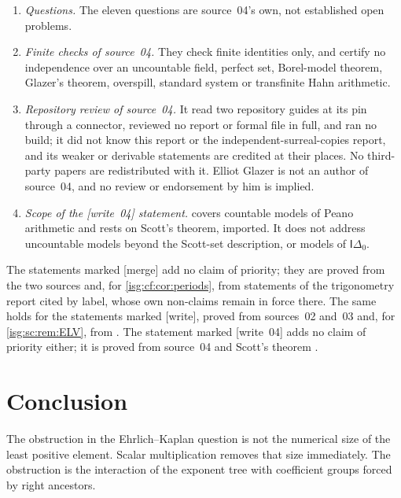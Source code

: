 \documentclass[11pt]{article}
\theoremstyle{definition}
\theoremstyle{remark}
\newcommand{\Idelta}{\mathsf{I}\Delta_0}
\begin{document}
\begin{enumerate}[label=\textup{(N\arabic*)},leftmargin=*]
      enlargement of the Turing ideal by an oracle. The elementary subfields
      are not complete and come with no computable selector. No Polish
      topology on $R_M$, continuity of arithmetic, or Borel global root
      selection is assumed or claimed.
\item \emph{Questions.} The eleven questions are source~04's own, not
      established open problems.
\item \emph{Finite checks of source~04.} They check finite identities
      only, and certify no independence over an uncountable field, perfect
      set, Borel-model theorem, Glazer's theorem, overspill, standard system
      or transfinite Hahn arithmetic.
\item \emph{Repository review of source~04.} It read two repository
      guides at its pin through a connector, reviewed no report or formal
      file in full, and ran no build; it did not know this report or the
      independent-surreal-copies report, and its weaker or derivable
      statements are credited at their places. No third-party papers are
      redistributed with it. Elliot Glazer is not an author of source~04,
      and no review or endorsement by him is implied.
\item \emph{Scope of the \textup{[write~04]} statement.}
       covers countable models of Peano arithmetic
      and rests on Scott's theorem, imported. It does not address
      uncountable models beyond the Scott-set description, or models of
      $\Idelta$.
\end{enumerate}
The statements marked \textup{[merge]} add no claim of priority; they are
proved from the two sources and, for \cref{isg:cf:cor:periods}, from
statements of the trigonometry report cited by label, whose own
non-claims remain in force there. The same holds for the statements marked
\textup{[write]}, proved from sources~02 and~03 and, for
\cref{isg:sc:rem:ELV}, from \cite[Theorem~2.9]{ELV}. The statement marked \textup{[write~04]} adds no claim of priority
either; it is proved from source~04 and Scott's theorem \cite{Scott}.

\section{Conclusion}\label{isg:sec:conclusion}
The obstruction in the Ehrlich--Kaplan question is not the numerical
size of the least positive element. Scalar multiplication removes that
size immediately. The obstruction is the interaction of the exponent
tree with coefficient groups forced by right ancestors.
\end{document}
